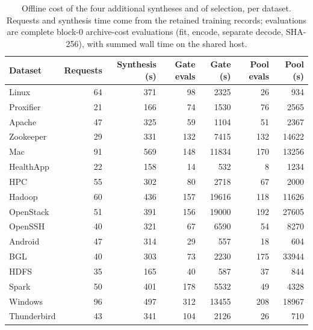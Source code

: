 \begin{table}[h]\centering\small
\caption{Offline cost of the four additional syntheses and of selection, per dataset. Requests and synthesis time come from the retained training records; evaluations are complete block-0 archive-cost evaluations (fit, encode, separate decode, SHA-256), with summed wall time on the shared host.}
\label{tab:selection-cost}
\begin{tabular}{lrrrrrr}
\toprule
Dataset & Requests & Synthesis (s) & Gate evals & Gate (s) & Pool evals & Pool (s) \\
\midrule
Linux & 64 & 371 & 98 & 2325 & 26 & 934 \\
Proxifier & 21 & 166 & 74 & 1530 & 76 & 2565 \\
Apache & 47 & 325 & 59 & 1104 & 51 & 2367 \\
Zookeeper & 29 & 331 & 132 & 7415 & 132 & 14622 \\
Mac & 91 & 569 & 148 & 11834 & 170 & 13256 \\
HealthApp & 22 & 158 & 14 & 532 & 8 & 1234 \\
HPC & 55 & 302 & 80 & 2718 & 67 & 2000 \\
Hadoop & 60 & 436 & 157 & 19616 & 118 & 11626 \\
OpenStack & 51 & 391 & 156 & 19000 & 192 & 27605 \\
OpenSSH & 40 & 321 & 67 & 6590 & 54 & 8270 \\
Android & 47 & 314 & 29 & 557 & 18 & 604 \\
BGL & 40 & 303 & 73 & 2230 & 175 & 33944 \\
HDFS & 35 & 165 & 40 & 587 & 37 & 844 \\
Spark & 50 & 401 & 178 & 5532 & 49 & 4328 \\
Windows & 96 & 497 & 312 & 13455 & 208 & 18967 \\
Thunderbird & 43 & 341 & 104 & 2126 & 26 & 710 \\
\bottomrule
\end{tabular}\end{table}
